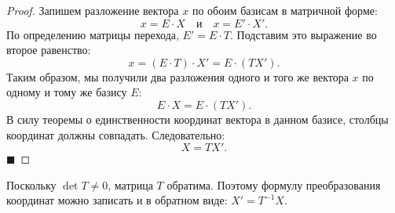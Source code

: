 \begin{proof}
Запишем разложение вектора $x$ по обоим базисам в матричной форме:
\[
x = E \cdot X \quad \text{и} \quad x = E' \cdot X'.
\]
По определению матрицы перехода, $E' = E \cdot T$. Подставим это выражение во второе равенство:
\[
x = (E \cdot T) \cdot X' = E \cdot (T X').
\]
Таким образом, мы получили два разложения одного и того же вектора $x$ по одному и тому же базису $E$:
\[
E \cdot X = E \cdot (T X').
\]
В силу теоремы о единственности координат вектора в данном базисе, столбцы координат должны совпадать. Следовательно:
\[
X = T X'.
\]
\hfill$\blacksquare$
\end{proof}

\begin{remark}
Поскольку $\det T \neq 0$, матрица $T$ обратима. Поэтому формулу преобразования координат можно записать и в обратном виде: $X' = T^{-1} X$.
\end{remark}
